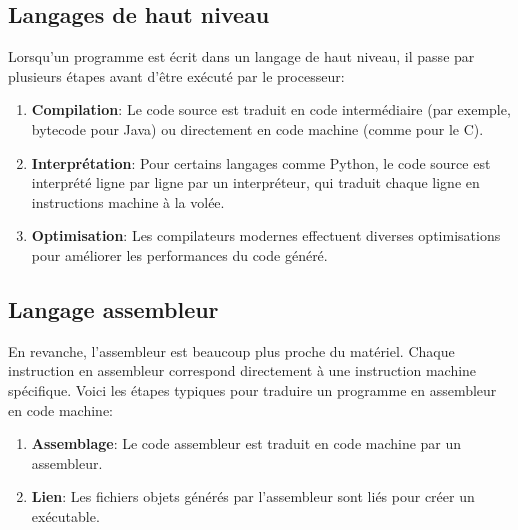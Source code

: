 \documentclass[a4paper, 12pt]{report}
\begin{document}
\subsection{Langages de haut niveau}
Lorsqu'un programme est écrit dans un langage de haut niveau, il passe par plusieurs étapes avant d'être exécuté par le processeur:
\begin{enumerate}
  \item \textbf{Compilation}: Le code source est traduit en code intermédiaire (par exemple, bytecode pour Java) ou directement en code machine (comme pour le C).
  \item \textbf{Interprétation}: Pour certains langages comme Python, le code source est interprété ligne par ligne par un interpréteur, qui traduit chaque ligne en instructions machine à la volée.
  \item \textbf{Optimisation}: Les compilateurs modernes effectuent diverses optimisations pour améliorer les performances du code généré.
\end{enumerate}

\subsection{Langage assembleur}
En revanche, l'assembleur est beaucoup plus proche du matériel. Chaque instruction en assembleur correspond directement à une instruction machine spécifique. Voici les étapes typiques pour traduire un programme en assembleur en code machine:
\begin{enumerate}
  \item \textbf{Assemblage}: Le code assembleur est traduit en code machine par un assembleur.
  \item \textbf{Lien}: Les fichiers objets générés par l'assembleur sont liés pour créer un exécutable.
\end{enumerate}
\end{document}
